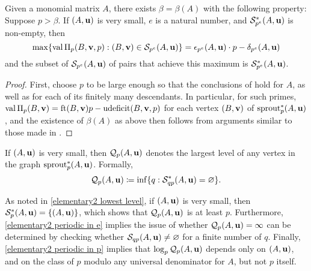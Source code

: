 \documentclass[11pt]{amsart}
\newcommand{\udeficit}{\operatorname{udeficit}}
\renewcommand{\S}{\mathcal{S}}
\begin{document}
\begin{proposition}
\label{p large graph: P}
Given a monomial matrix $A$, there exists $\beta = \beta(A)$ with the following property:  Suppose $p > \beta$.  If  $(A,\mathbf{u})$ is very small, $e$ is a natural number, and $\S_{p^e}^{\ast}(A,\vv{u})$ is non-empty, then 
\[ \max \{ \val \IP_p(B,\vv{v},p) : (B,\vv{v}) \in \S_{p^e}(A,\vv{u}) \} = \epsilon_{p^e}(A,\vv{u}) \cdot p-\delta_{p^e}(A,\vv{u})\] and  the subset of $\S_{p^e}(A,\vv{u})$ of pairs that achieve this maximum is $\S^{\ast}_{p^e}(A,\vv{u})$.
\end{proposition}

\begin{proof}  First, choose $p$ to be large enough so that the conclusions of 
 hold for $A$, as well as for each of its finitely many descendants.  In particular, for such primes, $\val \IP_p(B,\vv{v}) = \ft{B}{\vv{v}}p-\udeficit(B,\vv{v},p)$  for each vertex $(B,\mathbf{v})$ of $\operatorname{sprout}_p^{\ast}(A,\mathbf{u})$, and the existence of $\beta(A)$ as above then follows from arguments similar to those made in .
\end{proof}


\begin{definition}
If $(A,\mathbf{u})$ is very small, then $\mathcal{Q}_p(A,\mathbf{u})$ denotes the largest level of any vertex in the graph $\operatorname{sprout}_p^{\ast}(A,\mathbf{u})$.  Formally, 
\[\mathcal{Q}_p(A,\vv{u}) \coloneqq \inf \{ q :  \S^{\ast}_{qp}(A,\vv{u}) = \emptyset \}.\]
\end{definition}

\begin{remark}
As noted in \eqref{elementary2 lowest level}, if $(A,\mathbf{u})$ is very small, then $\S^{\ast}_p(A,\vv{u}) = \{ (A,\vv{u} )\}$, which shows that $\mathcal{Q}_p(A,\mathbf{u})$ is at least $p$.  Furthermore, \eqref{elementary2 periodic in e}  implies the issue of whether $\mathcal{Q}_p(A,\mathbf{u}) = \infty$ can be determined by checking whether $\S_{qp}(A,\vv{u}) \neq \emptyset$ for a finite number of $q$.  Finally, \eqref{elementary2 periodic in p} implies that $\log_p \mathcal{Q}_p(A,\mathbf{u})$ depends only on $(A,\mathbf{u})$, and on the class of $p$ modulo any universal denominator for $A$, but not $p$ itself. 
\end{remark}





\newpage

\end{document}
